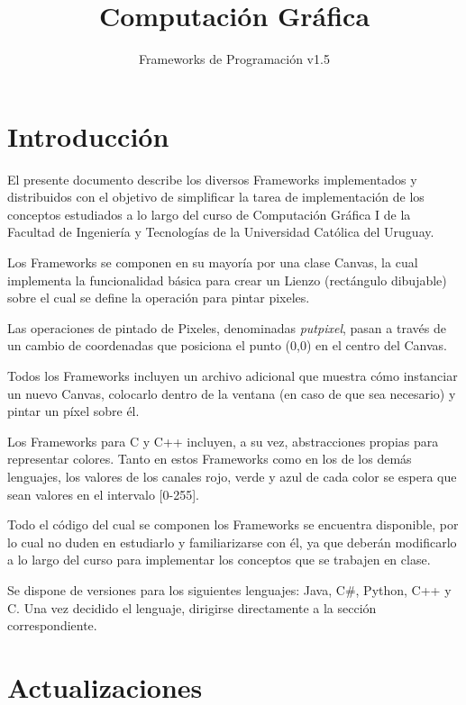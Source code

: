 \documentclass[11pt]{amsart}
\title{Computaci\'on Gr\'afica}
\author{Frameworks de Programaci\'on v1.5}
\begin{document}
\maketitle

\section{Introducci\'on}
El presente documento describe los diversos Frameworks implementados y distribuidos con el objetivo de simplificar la tarea de implementaci\'on de los conceptos estudiados a lo largo del curso de Computaci\'on Gr\'afica I de la Facultad de Ingenier\'ia y Tecnolog\'ias de la Universidad Cat\'olica del Uruguay.

Los Frameworks se componen en su mayor\'ia por una clase Canvas, la cual implementa la funcionalidad b\'asica para crear un Lienzo (rect\'angulo dibujable) sobre el cual se define la operación para pintar pixeles.

Las operaciones de pintado de Pixeles, denominadas \emph{putpixel}, pasan a trav\'es de un cambio de coordenadas que posiciona el punto (0,0) en el centro del Canvas.

Todos los Frameworks incluyen un archivo adicional que muestra c\'omo instanciar un nuevo Canvas, colocarlo dentro de la ventana (en caso de que sea necesario) y pintar un p\'ixel sobre \'el.

Los Frameworks para C y C++ incluyen, a su vez, abstracciones propias para representar colores. Tanto en estos Frameworks como en los de los dem\'as lenguajes, los valores de los canales rojo, verde y azul de cada color se espera que sean valores en el intervalo [0-255].

Todo el c\'odigo del cual se componen los Frameworks se encuentra disponible, por lo cual no duden en estudiarlo y familiarizarse con \'el, ya que deber\'an modificarlo a lo largo del curso para implementar los conceptos que se trabajen en clase.

Se dispone de versiones para los siguientes lenguajes: Java, C\#, Python, C++ y C. Una vez decidido el lenguaje, dirigirse directamente a la secci\'on correspondiente.

\section{Actualizaciones}
\end{document}
